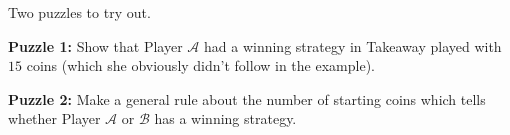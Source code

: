 \documentclass{beamer}
\theoremstyle{theorem}
\theoremstyle{definition}
\newcommand{\<}{\langle}
\renewcommand{\>}{\rangle}
\newcommand{\pl}[1]{\mathscr{#1}}
\newcommand{\vpause}{\pause\vspace{1em}}
\newcommand{\term}[1]{\textbf{#1}}
\begin{document}
\begin{frame}
  Two puzzles to try out.

  \vpause

  \textbf{Puzzle 1:} Show that Player $\pl A$ had a winning strategy
  in Takeaway played with $15$ coins (which she obviously didn't follow
  in the example).

  \vpause

  \textbf{Puzzle 2:} Make a general rule about the number of starting coins
  which tells whether Player $\pl A$ or $\pl B$ has a winning strategy.
\end{frame}









\end{document}
